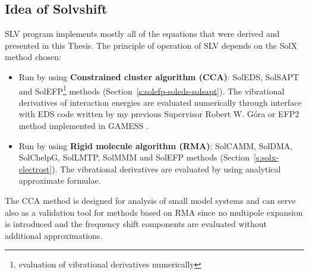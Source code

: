 \documentclass[b5paper,oneside,fleqn,11pt]{book}
\begin{document}
\begin{refsection}
\section{Idea of Solvshift}

SLV program implements mostly all of the equations that were derived
and presented in this Thesis. 
The principle of operation of SLV depends on the SolX method chosen:
%
\begin{itemize}
  \item Run by using {\bf Constrained cluster algorithm (CCA)}:
        SolEDS, SolSAPT and SolEFP\footnote{evaluation of vibrational derivatives numerically} 
        methods (Section~\ref{s:solefp-soleds-solsapt}). The vibrational derivatives of interaction
        energies are evaluated numerically through interface with EDS code
        written by my previous Supervisor Robert W. G{\'o}ra \citep{Gora.EDS.1998-2010}
        or EFP2 method implemented in {\sc GAMESS} \citep{GAMESS.JCC.1993}.
  \item Run by using {\bf Rigid molecule algorithm (RMA)}:
        SolCAMM, SolDMA, SolChelpG, SolLMTP, SolMMM and SolEFP methods (Section~\ref{s:solx-electrost}).
        The vibrational derivatives are evaluated by using analytical approximate formulae.
\end{itemize}
%
The CCA method is designed for analysis of small model systems
and can serve also as a validation tool for methods based on RMA
since no multipole expansion is introduced and the frequency shift
components are evaluated without additional approximations.


\end{refsection}
\end{document}
